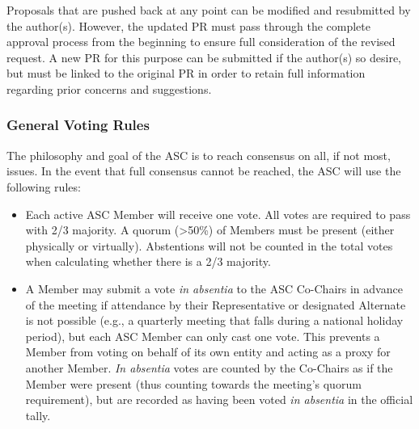 \documentclass{article}
\begin{document}
Proposals that are pushed back at any point can be modified and
resubmitted by the author(s). However, the updated PR must pass through
the complete approval process from the beginning to ensure full
consideration of the revised request. A new PR for this purpose can be
submitted if the author(s) so desire, but must be linked to the original
PR in order to retain full information regarding prior concerns and
suggestions.

\hypertarget{general-voting-rules}{%
\subsubsection{General Voting Rules}%
\label{general-voting-rules}}

The philosophy and goal of the ASC is to reach consensus on all, if not
most, issues. In the event that full consensus cannot be reached, the
ASC will use the following rules:

\begin{itemize}
\item
  Each active ASC Member will receive one vote. All votes are required
  to pass with 2/3 majority. A quorum (\textgreater50\%) of Members must
  be present (either physically or virtually). Abstentions will not be
  counted in the total votes when calculating whether there is a 2/3
  majority.
\item
  A Member may submit a vote \emph{in absentia} to the ASC Co-Chairs in
  advance of the meeting if attendance by their Representative or
  designated Alternate is not possible (e.g., a quarterly meeting that
  falls during a national holiday period), but each ASC Member can only
  cast one vote. This prevents a Member from voting on behalf of its own
  entity and acting as a proxy for another Member. \emph{In absentia}
  votes are counted by the Co-Chairs as if the Member were present (thus
  counting towards the meeting's quorum requirement), but are recorded
  as having been voted \emph{in absentia} in the official tally.
\end{itemize}
\end{document}
